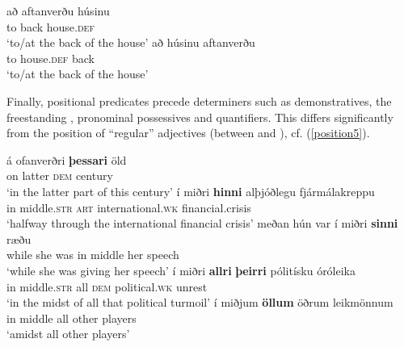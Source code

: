 \documentclass[output=paper,colorlinks,citecolor=brown]{langscibook}
\begin{document}
\begin{multicols}{2}{ 
\begin{exe}
  \ex\label{pospr3}
   \begin{xlist}
    \ex \gll  að aftanverðu  húsinu  \\
        to back house.\textsc{def} \\ 
        \glt `to/at the back of the house'
    \ex \gll  að húsinu  aftanverðu  \\
        to house.\textsc{def}  back   \\ 
        \glt `to/at the back of the house'
  \end{xlist}
\end{exe} }
\end{multicols} 


\begin{sloppypar}
Finally,  positional predicates precede determiners such as demonstratives, the freestanding ,  pronominal possessives and quantifiers. This differs significantly from the position of ``regular'' adjectives (between  and ), cf. (\ref{position5}).
\end{sloppypar}


\begin{exe}
   \ex \label{position5}
    \begin{xlist}
      	\ex \label{position5a} \gll á ofanverðri \textbf{þessari}  öld   \\
      	 on latter \textsc{dem}  century  \\
      	 \glt `in the latter part of this century' 
      	\ex \label{position5b} \gll í miðri \textbf{{{hinni}}} alþjóðlegu fjármálakreppu \\
      	 in middle.\textsc{str} \textsc{art} international.\textsc{wk} financial.crisis \\
         \glt  `halfway through the international financial crisis' 
      	\ex \label{position5c} \gll meðan hún var í miðri \textbf{sinni} ræðu \\
        	while she was in middle her speech \\
      	\glt `while she was giving  her speech'
      	\ex \label{position5d} \gll  í miðri  \textbf{allri} \textbf{þeirri} pólitísku óróleika \\  
          in  middle.\textsc{str} all \textsc{dem}  political.\textsc{wk} unrest  \\ 
          \glt `in the midst of all that political turmoil'
      	\ex \label{position5e} \gll   í  miðjum \textbf{öllum} öðrum leikmönnum \\
               in middle all other players   \\ 
               \glt `amidst all other players'
    \end{xlist}
\end{exe}
\end{document}

